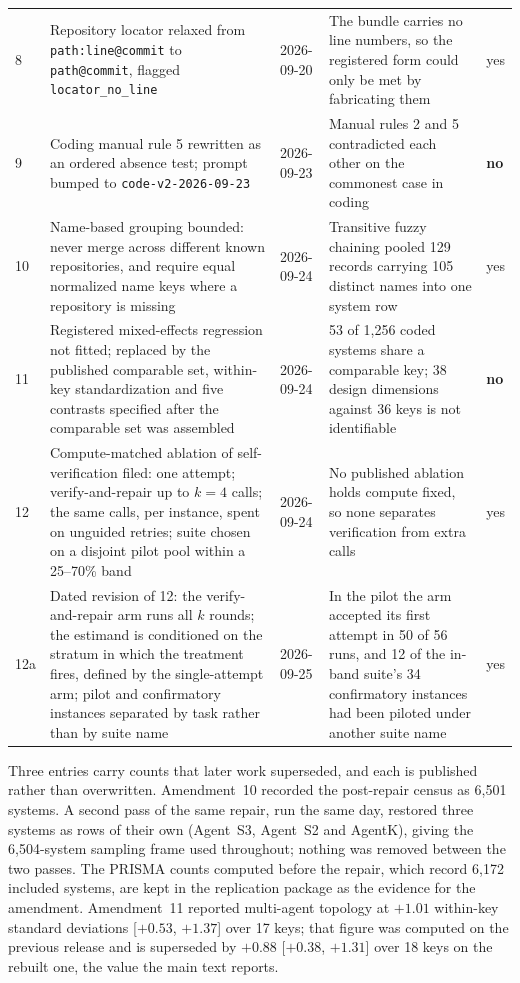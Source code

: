 \begin{table}[t]
\begin{tabular}{@{}l p{} l p{} l@{}}
    8 & Repository locator relaxed from \texttt{path:line@commit} to \texttt{path@commit}, flagged
        \texttt{locator\_no\_line} & 2026-09-20 & The bundle carries no line numbers, so the registered
        form could only be met by fabricating them & yes \\
    9 & Coding manual rule 5 rewritten as an ordered absence test; prompt bumped to
        \texttt{code-v2-2026-09-23} & 2026-09-23 & Manual rules 2 and 5 contradicted each other on the
        commonest case in coding & \textbf{no} \\
    10 & Name-based grouping bounded: never merge across different known repositories, and require equal
        normalized name keys where a repository is missing & 2026-09-24 & Transitive fuzzy chaining pooled
        129 records carrying 105 distinct names into one system row & yes \\
    11 & Registered mixed-effects regression not fitted; replaced by the published comparable set,
        within-key standardization and five contrasts specified after the comparable set was assembled &
        2026-09-24 & 53 of 1,256 coded systems share a comparable key; 38 design dimensions against 36 keys
        is not identifiable & \textbf{no} \\
    \midrule
    12 & Compute-matched ablation of self-verification filed: one attempt; verify-and-repair up to
        $k = 4$ calls; the same calls, per instance, spent on unguided retries; suite chosen on a disjoint pilot
        pool within a 25--70\% band & 2026-09-24 & No published ablation holds compute fixed, so none separates
        verification from extra calls & yes \\
    12a & Dated revision of 12: the verify-and-repair arm runs all $k$ rounds; the estimand is conditioned on
        the stratum in which the treatment fires, defined by the single-attempt arm; pilot and confirmatory
        instances separated by task rather than by suite name & 2026-09-25 & In the pilot the arm accepted its
        first attempt in 50 of 56 runs, and 12 of the in-band suite's 34 confirmatory instances had been piloted
        under another suite name & yes \\
    \bottomrule
  \end{tabular}
\end{table}

Three entries carry counts that later work superseded, and each is published rather than overwritten.
Amendment~10 recorded the post-repair census as 6,501 systems. A second pass of the same repair, run the
same day, restored three systems as rows of their own (Agent~S3, Agent~S2 and AgentK), giving the 6,504-system
sampling frame used throughout; nothing was removed between the two passes. The PRISMA counts computed before
the repair, which record 6,172 included systems, are kept in the replication package as the evidence for the
amendment. Amendment~11 reported multi-agent topology at $+1.01$ within-key standard deviations
[$+0.53$, $+1.37$] over 17 keys; that figure was computed on the previous release and is superseded by
$+0.88$ [$+0.38$, $+1.31$] over 18 keys on the rebuilt one, the value the main text reports.


